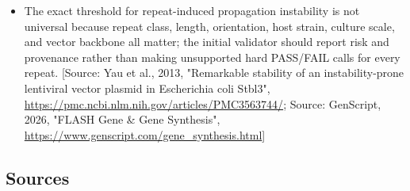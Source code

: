 \documentclass[11pt]{report}
\begin{document}
\begin{itemize}
\item The exact threshold for repeat-induced propagation instability is not universal because repeat class, length, orientation, host strain, culture scale, and vector backbone all matter; the initial validator should report risk and provenance rather than making unsupported hard PASS/FAIL calls for every repeat. [Source: Yau et al., 2013, "Remarkable stability of an instability-prone lentiviral vector plasmid in Escherichia coli Stbl3", \url{https://pmc.ncbi.nlm.nih.gov/articles/PMC3563744/}; Source: GenScript, 2026, "FLASH Gene \& Gene Synthesis", \url{https://www.genscript.com/gene_synthesis.html}]
\end{itemize}

\subsection{Sources}
\end{document}
